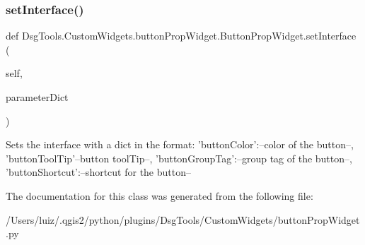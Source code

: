 \subsubsection{\texorpdfstring{set\+Interface()}{setInterface()}}
{\footnotesize\ttfamily def Dsg\+Tools.\+Custom\+Widgets.\+button\+Prop\+Widget.\+Button\+Prop\+Widget.\+set\+Interface (\begin{DoxyParamCaption}\item[{}]{self,  }\item[{}]{parameter\+Dict }\end{DoxyParamCaption})}

\begin{DoxyVerb}Sets the interface with a dict in the format:
{
    'buttonColor':--color of the button--, 
    'buttonToolTip'--button toolTip--, 
    'buttonGroupTag':--group tag of the button--,
    'buttonShortcut':--shortcut for the button--
}
\end{DoxyVerb}
 

The documentation for this class was generated from the following file\+:\begin{DoxyCompactItemize}
\item 
/\+Users/luiz/.\+qgis2/python/plugins/\+Dsg\+Tools/\+Custom\+Widgets/button\+Prop\+Widget.\+py\end{DoxyCompactItemize}
